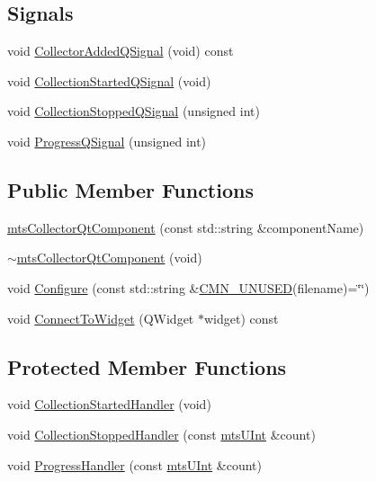 \subsection*{Signals}
\begin{DoxyCompactItemize}
\item 
void \hyperlink{classmts_collector_qt_component_adf2c95bbca70332594de2e61affdd2f6}{Collector\+Added\+Q\+Signal} (void) const 
\item 
void \hyperlink{classmts_collector_qt_component_adb2bcd73754b187d969c06b3f961a425}{Collection\+Started\+Q\+Signal} (void)
\item 
void \hyperlink{classmts_collector_qt_component_a3a1bb21c889148a474b43b871082c511}{Collection\+Stopped\+Q\+Signal} (unsigned int)
\item 
void \hyperlink{classmts_collector_qt_component_aa256f60afac2f43bdf991d5ef179bf16}{Progress\+Q\+Signal} (unsigned int)
\end{DoxyCompactItemize}
\subsection*{Public Member Functions}
\begin{DoxyCompactItemize}
\item 
\hyperlink{classmts_collector_qt_component_ae4f9827203aad5d2ddefb21733cf1884}{mts\+Collector\+Qt\+Component} (const std\+::string \&component\+Name)
\item 
\hyperlink{classmts_collector_qt_component_a712616b1d64f8fcde6b9ca6796a1fb7e}{$\sim$mts\+Collector\+Qt\+Component} (void)
\item 
void \hyperlink{classmts_collector_qt_component_ae26b8dd5c49c06493a2a6b316f447bfb}{Configure} (const std\+::string \&\hyperlink{cmn_portability_8h_a021894e2626935fa2305434b1e893ff6}{C\+M\+N\+\_\+\+U\+N\+U\+S\+E\+D}(filename)=\char`\"{}\char`\"{})
\item 
void \hyperlink{classmts_collector_qt_component_a243287888fb742cc81fd53bb8eb30b62}{Connect\+To\+Widget} (Q\+Widget $\ast$widget) const 
\end{DoxyCompactItemize}
\subsection*{Protected Member Functions}
\begin{DoxyCompactItemize}
\item 
void \hyperlink{classmts_collector_qt_component_a28959a6307475a97abd5c74017bc2e11}{Collection\+Started\+Handler} (void)
\item 
void \hyperlink{classmts_collector_qt_component_a6fc1efb58a3f87f4cdb0ee7869796bd1}{Collection\+Stopped\+Handler} (const \hyperlink{mts_generic_object_proxy_8h_aa17aa0caae80dcf94844f2bd9942adba}{mts\+U\+Int} \&count)
\item 
void \hyperlink{classmts_collector_qt_component_aab79eab8ea9ba41ffae55e59d2772890}{Progress\+Handler} (const \hyperlink{mts_generic_object_proxy_8h_aa17aa0caae80dcf94844f2bd9942adba}{mts\+U\+Int} \&count)
\end{DoxyCompactItemize}
